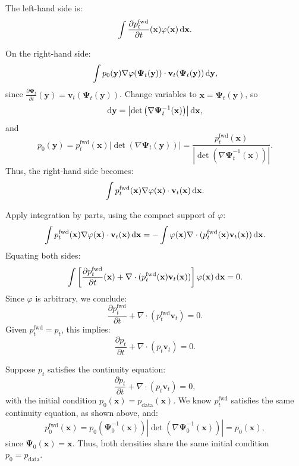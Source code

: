 The left-hand side is:
\[
\int \frac{\partial p_t^{\mathrm{fwd}}}{\partial t}(\mathbf{x}) \varphi(\mathbf{x}) \mathop{}\!\mathrm{d}\mathbf{x}.
\]

On the right-hand side:
\[
\int p_0(\mathbf{y}) \nabla \varphi(\bm{\Psi}_t(\mathbf{y})) \cdot \mathbf{v}_t(\bm{\Psi}_t(\mathbf{y})) \mathop{}\!\mathrm{d}\mathbf{y},
\]
since $ \frac{\partial \bm{\Psi}_t}{\partial t}(\mathbf{y}) = \mathbf{v}_t(\bm{\Psi}_t(\mathbf{y})) $.
Change variables to $ \mathbf{x} = \bm{\Psi}_t(\mathbf{y}) $, so 
\[
\mathop{}\!\mathrm{d}\mathbf{y} = \left| \det\left( \nabla \bm{\Psi}_t^{-1}(\mathbf{x}) \right) \right| \mathop{}\!\mathrm{d}\mathbf{x} ,
\]
 and
\[
p_0(\mathbf{y}) = p_t^{\mathrm{fwd}}(\mathbf{x}) \left| \det\left( \nabla \bm{\Psi}_t(\mathbf{y}) \right) \right| = \frac{p_t^{\mathrm{fwd}}(\mathbf{x})}{\left| \det\left( \nabla \bm{\Psi}_t^{-1}(\mathbf{x}) \right) \right|}.
\]
Thus, the right-hand side becomes:
\[
\int p_t^{\mathrm{fwd}}(\mathbf{x}) \nabla \varphi(\mathbf{x}) \cdot \mathbf{v}_t(\mathbf{x}) \mathop{}\!\mathrm{d}\mathbf{x}.
\]

Apply integration by parts, using the compact support of $ \varphi $:
\[
\int p_t^{\mathrm{fwd}}(\mathbf{x}) \nabla \varphi(\mathbf{x}) \cdot \mathbf{v}_t(\mathbf{x}) \mathop{}\!\mathrm{d}\mathbf{x} = -\int \varphi(\mathbf{x}) \nabla \cdot (p_t^{\mathrm{fwd}}(\mathbf{x}) \mathbf{v}_t(\mathbf{x})) \mathop{}\!\mathrm{d}\mathbf{x}.
\]
Equating both sides:
\[
\int \left[ \frac{\partial p_t^{\mathrm{fwd}}}{\partial t}(\mathbf{x}) + \nabla \cdot (p_t^{\mathrm{fwd}}(\mathbf{x}) \mathbf{v}_t(\mathbf{x})) \right] \varphi(\mathbf{x}) \mathop{}\!\mathrm{d}\mathbf{x} = 0.
\]
Since $ \varphi $ is arbitrary, we conclude:
\[
\frac{\partial p_t^{\mathrm{fwd}}}{\partial t} + \nabla \cdot (p_t^{\mathrm{fwd}} \mathbf{v}_t) = 0.
\]
Given $ p_t^{\mathrm{fwd}} = p_t $, this implies:
\[
\frac{\partial p_t}{\partial t} + \nabla \cdot (p_t \mathbf{v}_t) = 0.
\]


 Suppose $ p_t $ satisfies the continuity equation:
\[
\frac{\partial p_t}{\partial t} + \nabla \cdot (p_t \mathbf{v}_t) = 0,
\]
with the initial condition $ p_0(\mathbf{x}) = p_{\mathrm{data}}(\mathbf{x}) $. We know $ p_t^{\mathrm{fwd}} $ satisfies the same continuity equation, as shown above, and:
\[
p_0^{\mathrm{fwd}}(\mathbf{x}) = p_0(\bm{\Psi}_0^{-1}(\mathbf{x})) \left| \det\left( \nabla \bm{\Psi}_0^{-1}(\mathbf{x}) \right) \right| = p_0(\mathbf{x}),
\]
since $ \bm{\Psi}_0(\mathbf{x}) = \mathbf{x} $. Thus, both densities share the same initial condition $ p_0 = p_{\mathrm{data}} $.

